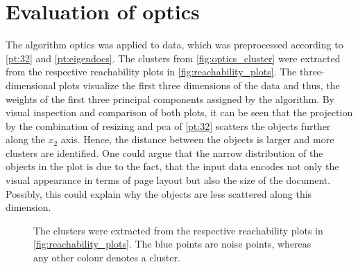 \section{Evaluation of \acs{optics}}\label{sec:evaluation-OPTICS}
The algorithm \ac{optics} was applied to data, which was preprocessed according to \autoref{pt:32} and \autoref{pt:eigendocs}.
The clusters from \autoref{fig:optics_cluster} were extracted from the respective reachability plots in \autoref{fig:reachability_plots}.
The three-dimensional plots visualize the first three dimensions of the data and thus, the weights of the first three principal components assigned by the \eigendocs{} algorithm.
By visual inspection and comparison of both plots, it can be seen that the projection by the combination of resizing and \ac{pca} of \autoref{pt:32} scatters the objects further along the $x_2$ axis.
Hence, the distance between the objects is larger and more clusters are identified.
One could argue that the narrow distribution of the objects in the \eigendocs{} plot is due to the fact, 
that the input data encodes not only the visual appearance in terms of page layout but also the size of the document.
Possibly, this could explain why the objects are less scattered along this dimension.

\begin{figure}%
    \centering
    \qquad
    \caption{The clusters were extracted from the respective reachability plots in \autoref{fig:reachability_plots}.
    The blue points are noise points, whereas any other colour denotes a cluster.}%
    \label{fig:optics_cluster}%
\end{figure}



